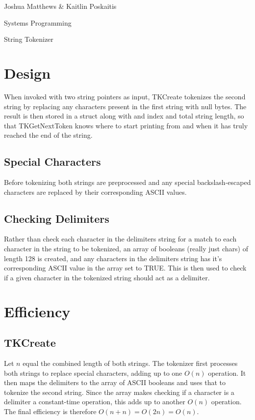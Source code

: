 \documentclass[letterpaper,12pt]{article}
\begin{document}
\noindent Joshua Matthews \& Kaitlin Poskaitis

\noindent Systems Programming

\noindent String Tokenizer

\section{Design}
When invoked with two string pointers as input, TKCreate tokenizes the second
string by replacing any characters present in the first string with null bytes.
The result is then stored in a struct along with and index and total string
length, so that TKGetNextToken knows where to start printing from and when it
has truly reached the end of the string.

\subsection{Special Characters}
Before tokenizing both strings are preprocessed and any special
backslash-escaped characters are replaced by their corresponding ASCII values.

\subsection{Checking Delimiters}
Rather than check each character in the delimiters string for a match to each
character in the string to be tokenized, an array of booleans (really just
chars) of length 128 is created, and any characters in the delimiters string has
it's corresponding ASCII value in the array set to TRUE. This is then used to
check if a given character in the tokenized string should act as a delimiter.

\section{Efficiency}
\subsection{TKCreate}
Let $n$ equal the combined length of both strings. The tokenizer first processes
both strings to replace special characters, adding up to one $O(n)$ operation.
It then maps the delimiters to the array of ASCII booleans and uses that to
tokenize the second string. Since the array makes checking if a character is a
delimiter a constant-time operation, this adds up to another $O(n)$ operation.
The final efficiency is therefore $O(n + n) = O(2n) = O(n)$.
\end{document}
